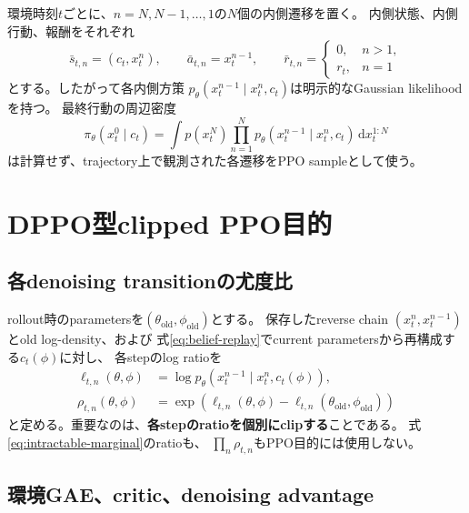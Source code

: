 \documentclass[a4paper,11pt]{article}
\newcommand{\old}{\mathrm{old}}
\begin{document}
環境時刻$t$ごとに、$n=N,N-1,\ldots,1$の$N$個の内側遷移を置く。
内側状態、内側行動、報酬をそれぞれ
\begin{equation}
  \bar s_{t,n}=(c_t,x_t^n),\qquad
  \bar a_{t,n}=x_t^{n-1},\qquad
  \bar r_{t,n}=
  \begin{cases}
    0,&n>1,\\
    r_t,&n=1
  \end{cases}
  \label{eq:augmented-mdp}
\end{equation}
とする。したがって各内側方策
$p_\theta(x_t^{n-1}\mid x_t^n,c_t)$は明示的なGaussian likelihoodを持つ。
最終行動の周辺密度
\begin{equation}
  \pi_\theta(x_t^0\mid c_t)
  =\int p(x_t^N)\prod_{n=1}^{N}
    p_\theta(x_t^{n-1}\mid x_t^n,c_t)\,
    \mathrm{d}x_t^{1:N}
  \label{eq:intractable-marginal}
\end{equation}
は計算せず、trajectory上で観測された各遷移をPPO sampleとして使う。

\section{DPPO型clipped PPO目的}

\subsection{各denoising transitionの尤度比}

rollout時のparametersを$(\theta_{\old},\phi_{\old})$とする。
保存したreverse chain $(x_t^n,x_t^{n-1})$とold log-density、および
式\eqref{eq:belief-replay}でcurrent parametersから再構成する$c_t(\phi)$に対し、
各stepのlog ratioを
\begin{align}
  \ell_{t,n}(\theta,\phi)
    &=\log p_\theta(x_t^{n-1}\mid x_t^n,c_t(\phi)),\\
  \rho_{t,n}(\theta,\phi)
    &=\exp\!\left(
      \ell_{t,n}(\theta,\phi)-\ell_{t,n}(\theta_{\old},\phi_{\old})
    \right)
  \label{eq:step-ratio}
\end{align}
と定める。重要なのは、\textbf{各stepのratioを個別にclipする}ことである。
式\eqref{eq:intractable-marginal}のratioも、
$\prod_n\rho_{t,n}$もPPO目的には使用しない。

\subsection{環境GAE、critic、denoising advantage}
\end{document}
